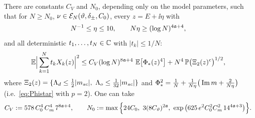 \begin{proposition}\label{prop:FAtwo}
There are constants $C_V$ and $N_0$, depending only on the model parameters, such that for $N\ge N_0$, $\nu\in\mathcal E_N(\vartheta,\delta_\pm,C_0)$, every $z=E+\ii\eta$ with
\[
 N^{-1}\le\eta\le10,\qquad N\eta\ge(\log N)^{4\mathfrak{a}+4},
\]
and all deterministic $t_1,\dots,t_N\in\mathbb{C}$ with $|t_k|\le1/N$:
\begin{equation}\label{eq:FAtwo}
 \EE\Big|\sum_{k=1}^Nt_kX_k(z)\Big|^2\le C_V(\log N)^{8\fa+4}\ \EE\big[\Phi_*(z)^4\big]+N^4\,\PP\big(\Xi_2(z)^c\big)^{1/2},
\end{equation}
where $\Xi_2(z)=\{\Ld\le\frac12|\msc|,\ \Lo\le\frac1{32}|\msc|\}$ and $\Phi_*^2=\frac1N+\frac1{N\eta}\big(\operatorname{Im} m+\frac2{N\eta}\big)$ (i.e.\ \eqref{eq:Phistar} with $p=2$). One can take
\begin{equation}\label{eq:CV}
 C_V:=578\,C_0^4\,C_m^4\,7^{8\fa+4},\qquad N_0:=\max\Big\{24C_0,\ 3(8C_\vth)^{2\fa},\ \exp\big(625\,e^2C_0^2C_m^2\,14^{4\fa+3}\big)\Big\}.
\end{equation}
\end{proposition}
